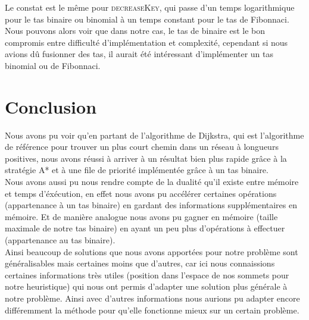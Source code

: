 \documentclass{article}
\begin{document}
Le constat est le même pour \textsc{decreaseKey}, qui passe d'un temps logarithmique pour le tas binaire
ou binomial à un temps constant pour le tas de Fibonnaci.\\

Nous pouvons alors voir que dans notre cas, le tas de binaire est le bon compromis entre difficulté
d'implémentation et complexité, cependant si nous avions dû fusionner des tas, il aurait été intéressant
d'implémenter un tas binomial ou de Fibonnaci.



\pagebreak
\section{Conclusion}

Nous avons pu voir qu'en partant de l'algorithme de Dijkstra, qui est l'algorithme de référence pour trouver
un plus court chemin dans un réseau à longueurs positives, nous avons réussi à arriver à un résultat bien
plus rapide grâce à la stratégie A* et à une file de priorité implémentée grâce à un tas binaire.\\
Nous avons aussi pu nous rendre compte de la dualité qu'il existe entre mémoire et temps d'éxécution,
en effet nous avons pu accélérer certaines opérations (appartenance à un tas binaire) en gardant des
informations supplémentaires en mémoire. Et de manière analogue nous avons pu gagner en mémoire (taille
maximale de notre tas binaire) en ayant un peu plus d'opérations à effectuer (appartenance au tas binaire).\\

Ainsi beaucoup de solutions que nous avons apportées pour notre problème sont généralisables mais certaines
moins que d'autres, car ici nous connaissions certaines informations très utiles (position dans l'espace
de nos sommets pour notre heuristique) qui nous ont permis d'adapter une solution plus générale à notre
problème. Ainsi avec d'autres informations nous aurions pu adapter encore différemment la méthode pour
qu'elle fonctionne mieux sur un certain problème.
\end{document}
